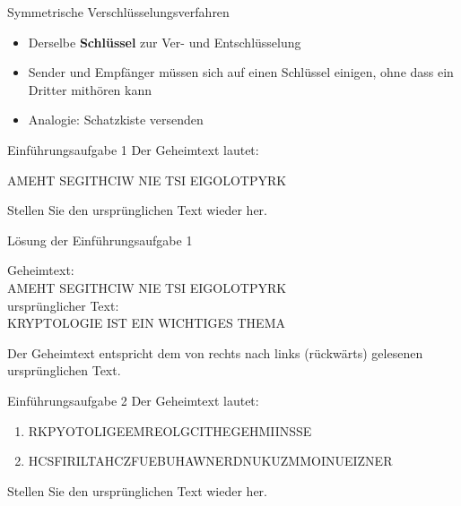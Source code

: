 \begin{frame}{Symmetrische Verschlüsselungsverfahren}
    \begin{itemize}[<+->]
        \item {} Derselbe \textbf{Schlüssel} zur Ver- und Entschlüsselung
        \item {} Sender und Empfänger müssen sich auf einen Schlüssel einigen, ohne dass ein Dritter mithören kann
        \item {} Analogie: Schatzkiste versenden
    \end{itemize}

\end{frame}

\begin{frame}[label=intro1]{Einführungsaufgabe 1}
    Der Geheimtext lautet:
    \begin{center}
        AMEHT SEGITHCIW NIE TSI EIGOLOTPYRK
    \end{center}
    Stellen Sie den ursprünglichen Text wieder her.
\end{frame}

\begin{frame}[label=intro1Sol]{Lösung der Einführungsaufgabe 1}
    \begin{center}
    
        Geheimtext:\\
        AMEHT SEGITHCIW NIE TSI EIGOLOTPYRK\\
        \bigskip
        ursprünglicher Text:\\
        KRYPTOLOGIE IST EIN WICHTIGES THEMA\\
    \end{center}
    Der Geheimtext entspricht dem von rechts nach links (rückwärts) gelesenen ursprünglichen Text.
\end{frame}

\begin{frame}[label=intro2]{Einführungsaufgabe 2}
    Der Geheimtext lautet:
    \begin{center}
    \small
        \begin{enumerate}
            \item RKPYOTOLIGEEMREOLGCITHEGEHMIINSSE
            \item HCSFIRILTAHCZFUEBUHAWNERDNUKUZMMOINUEIZNER
        \end{enumerate}
        \normalsize
    \end{center}
    Stellen Sie den ursprünglichen Text wieder her.
\end{frame}

